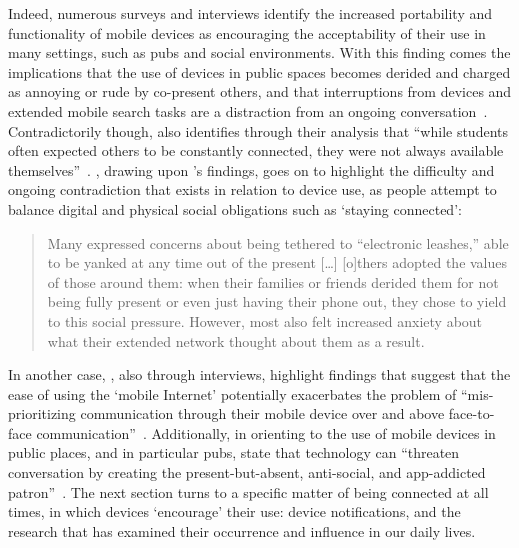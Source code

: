 Indeed, numerous surveys and interviews identify the increased portability and functionality of mobile devices as encouraging the acceptability of their use in many settings, such as pubs and social environments.
With this finding comes the implications that the use of devices in public spaces becomes derided and charged as annoying or rude by co-present others, and that interruptions from devices and extended mobile search tasks are a distraction from an ongoing conversation~\citep{Ames2013,Church2012,Campbell2007}.
Contradictorily though, \citet{Ames2013} also identifies through their analysis that ``while students often expected others to be constantly connected, they were not always available themselves''~\citep[p. 1494]{Ames2013}.
\citet{Ames2013}, drawing upon \citet{Turkle2011}'s findings, goes on to highlight the difficulty and ongoing contradiction that exists in relation to device use, as people attempt to balance digital and physical social obligations such as `staying connected':
\begin{quote}
    Many expressed concerns about being tethered to ``electronic leashes,'' able to be yanked at any time out of the present [\ldots] [o]thers adopted the values of those around them: when their families or friends derided them for not being fully present or even just having their phone out, they chose to yield to this social pressure. However, most also felt increased anxiety about what their extended network thought about them as a result.
\end{quote}
In another case, \citet{Humphreys2013}, also through interviews, highlight findings that suggest that the ease of using the `mobile Internet' potentially exacerbates the problem of ``mis-prioritizing communication through their mobile device over and above face-to-face communication''~\citep[p. 501]{Humphreys2013}.
Additionally, in orienting to the use of mobile devices in public places, and in particular pubs, \citet{Su2015} state that technology can ``threaten conversation by creating the present-but-absent, anti-social, and app-addicted patron''~\citep[p. 1667]{Su2015}.
The next section turns to a specific matter of being connected at all times, in which devices `encourage' their use: device notifications, and the research that has examined their occurrence and influence in our daily lives.






